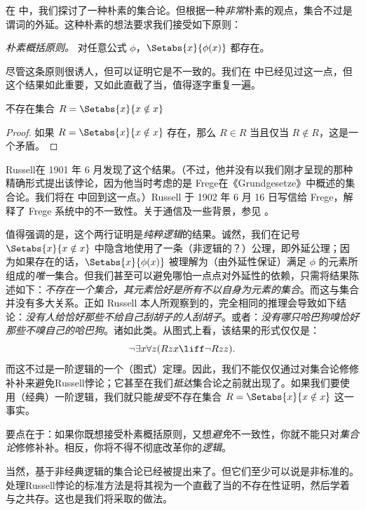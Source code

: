 \documentclass[../../../include/open-logic-section]{subfiles}
\begin{document}

在  中，我们探讨了一种朴素的集合论。但根据一种\emph{非常}朴素的观点，集合不过是谓词的外延。这种朴素的想法要求我们接受如下原则：

\begin{defish}
  \emph{朴素概括原则。} 对任意公式 $\phi$，$\Setabs{x}{\phi(x)}$ 都存在。
\end{defish}

尽管这条原则很诱人，但可以证明它是不一致的。我们在  中已经见过这一点，但这个结果如此重要，又如此直截了当，值得逐字重复一遍。

\begin{thm}[Russell悖论]
不存在集合 $R = \Setabs{x}{x \notin x}$
\end{thm}

\begin{proof}
如果 $R = \Setabs{x}{x \notin x}$ 存在，那么 $R \in R$ 当且仅当 $R \notin R$，这是一个矛盾。
\end{proof}

Russell在 1901 年 6 月发现了这个结果。（不过，他并没有以我们刚才呈现的那种精确形式提出该悖论，因为他当时考虑的是 Frege在《Grundgesetze》中概述的集合论。我们将在  中回到这一点。）Russell 于 1902 年 6 月 16 日写信给 Frege，解释了 Frege 系统中的不一致性。关于通信及一些背景，参见 \citet[pp.~124--8]{Heijenoort1967}。

值得强调的是，这个两行证明是\emph{纯粹逻辑}的结果。诚然，我们在记号 $\Setabs{x}{x \notin x}$ 中隐含地使用了一条（非逻辑的？）公理，即外延公理；因为如果存在的话，$\Setabs{x}{\phi(x)}$ 被理解为（由外延性保证）满足 $\phi$ 的元素所组成的\emph{唯一}集合。但我们甚至可以避免哪怕一点点对外延性的依赖，只需将结果陈述如下：\emph{不存在一个集合，其元素恰好是所有不以自身为元素的集合}。而这与集合并没有多大关系。正如 Russell 本人所观察到的，完全相同的推理会导致如下结论：\emph{没有人给恰好那些不给自己刮胡子的人刮胡子}。或者：\emph{没有哪只哈巴狗嗅恰好那些不嗅自己的哈巴狗}。诸如此类。从图式上看，该结果的形式仅仅是：
\[
\lnot \exists x \forall z(Rzx \liff \lnot R zz).
\]
而这不过是一阶逻辑的一个（图式）定理。因此，我们不能仅仅通过对集合论修修补补来避免Russell悖论；它甚至在我们\emph{抵达}集合论之前就出现了。如果我们要使用（经典）一阶逻辑，我们就只能\emph{接受}不存在集合 $R = \Setabs{x}{x\notin x}$ 这一事实。

要点在于：如果你既想接受朴素概括原则，又想\emph{避免}不一致性，你就不能只对\emph{集合论}修修补补。相反，你将不得不彻底改革你的\emph{逻辑}。

当然，基于非经典逻辑的集合论已经被提出来了。但它们至少可以说是非标准的。处理Russell悖论的标准方法是将其视为一个直截了当的不存在性证明，然后学着与之共存。这也是我们将采取的做法。
\end{document}
